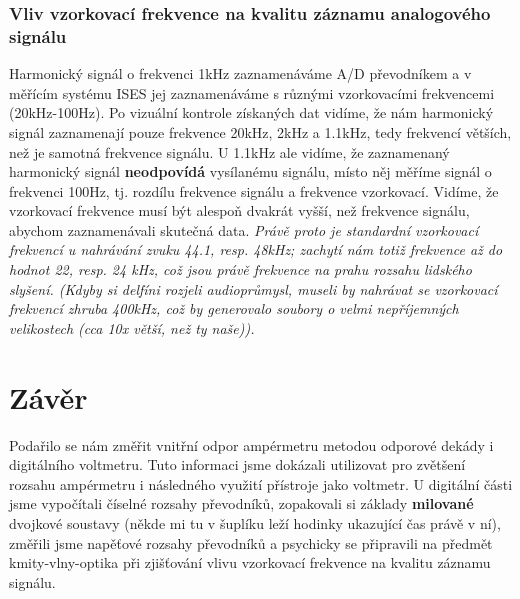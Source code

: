 \documentclass[czech,11pt,a4paper]{article}
\begin{document}
	\subsubsection{Vliv vzorkovací frekvence na kvalitu záznamu analogového signálu}
	Harmonický signál o frekvenci 1kHz zaznamenáváme A/D převodníkem a v měřícím systému ISES jej zaznamenáváme s různými vzorkovacími frekvencemi (20kHz-100Hz). Po vizuální kontrole získaných dat vidíme, že nám harmonický signál zaznamenají pouze frekvence 20kHz, 2kHz a 1.1kHz, tedy frekvencí větších, než je samotná frekvence signálu. U 1.1kHz ale vidíme, že zaznamenaný harmonický signál \textbf{neodpovídá} vysílanému signálu, místo něj měříme signál o frekvenci 100Hz, tj. rozdílu frekvence signálu a frekvence vzorkovací. Vidíme, že vzorkovací frekvence musí být alespoň dvakrát vyšší, než frekvence signálu, abychom zaznamenávali skutečná data. \textit{Právě proto je standardní vzorkovací frekvencí u nahrávání zvuku 44.1, resp. 48kHz; zachytí nám totiž frekvence až do hodnot 22, resp. 24 kHz, což jsou právě frekvence na prahu rozsahu lidského slyšení. (Kdyby si delfíni rozjeli audioprůmysl, museli by nahrávat se vzorkovací frekvencí zhruba 400kHz, což by generovalo soubory o velmi nepříjemných velikostech (cca 10x větší, než ty naše)).}
	
	\section{Závěr}
	Podařilo se nám změřit vnitřní odpor ampérmetru metodou odporové dekády i digitálního voltmetru. Tuto informaci jsme dokázali utilizovat pro zvětšení rozsahu ampérmetru i následného využití přístroje jako voltmetr. U digitální části jsme vypočítali číselné rozsahy převodníků, zopakovali si základy \textbf{milované} dvojkové soustavy (někde mi tu v šuplíku leží hodinky ukazující čas právě v ní), změřili jsme napěťové rozsahy převodníků a psychicky se připravili na předmět kmity-vlny-optika při zjišťování vlivu vzorkovací frekvence na kvalitu záznamu signálu. 

	
	
\end{document}
